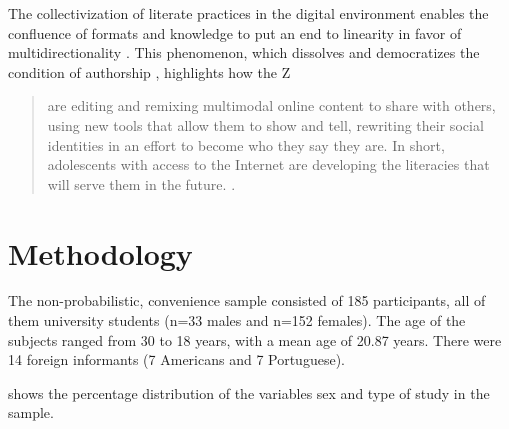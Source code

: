 \documentclass[english]{textolivre}
\begin{document}
The collectivization of literate practices in the digital environment enables the confluence of formats and knowledge to put an end to linearity in favor of multidirectionality \cite{ezquerro2017leyendistica}. This phenomenon, which dissolves and democratizes the condition of authorship \cite{perez2016competencia}, highlights how the Z 

\begin{quote}
    are editing and remixing multimodal online content to share with others, using new tools that allow them to show and tell, rewriting their social identities in an effort to become who they say they are. In short, adolescents with access to the Internet are developing the literacies that will serve them in the future. \cite[p.~10]{cabello2017general}.
\end{quote}

\section{Methodology}
The non-probabilistic, convenience sample \cite{icart_isern_elaboracion_2000} consisted of 185 participants, all of them university students (n=33 males and n=152 females). The age of the subjects ranged from 30 to 18 years, with a mean age of 20.87 years. There were 14 foreign informants (7 Americans and 7 Portuguese).

 shows the percentage distribution of the variables sex and type of study in the sample. 

\begin{table}[h!]
\centering
\caption{Description of the variables used in the sample}
\label{tab01}
\end{table}
\end{document}
